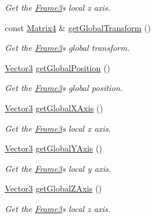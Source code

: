 \begin{DoxyCompactItemize}
\begin{DoxyCompactList}\small\item\em Get the \hyperlink{class_i_dream_sky_1_1_frame3}{Frame3}\textquotesingle{}s local z axis. \end{DoxyCompactList}\item 
const \hyperlink{class_i_dream_sky_1_1_matrix4}{Matrix4} \& \hyperlink{class_i_dream_sky_1_1_frame3_a57a2f755811f485d9602103609c78d68}{get\+Global\+Transform} ()
\begin{DoxyCompactList}\small\item\em Get the \hyperlink{class_i_dream_sky_1_1_frame3}{Frame3}\textquotesingle{}s global transform. \end{DoxyCompactList}\item 
\hyperlink{class_i_dream_sky_1_1_vector3}{Vector3} \hyperlink{class_i_dream_sky_1_1_frame3_a02ef2b5e486c10f94fdf13885c37ebc6}{get\+Global\+Position} ()
\begin{DoxyCompactList}\small\item\em Get the \hyperlink{class_i_dream_sky_1_1_frame3}{Frame3}\textquotesingle{}s global position. \end{DoxyCompactList}\item 
\hyperlink{class_i_dream_sky_1_1_vector3}{Vector3} \hyperlink{class_i_dream_sky_1_1_frame3_aa8919e85a3ebe1869aa8b1ba439bc92f}{get\+Global\+X\+Axis} ()
\begin{DoxyCompactList}\small\item\em Get the \hyperlink{class_i_dream_sky_1_1_frame3}{Frame3}\textquotesingle{}s local x axis. \end{DoxyCompactList}\item 
\hyperlink{class_i_dream_sky_1_1_vector3}{Vector3} \hyperlink{class_i_dream_sky_1_1_frame3_a0692e3724e53edf06e828470e74833cd}{get\+Global\+Y\+Axis} ()
\begin{DoxyCompactList}\small\item\em Get the \hyperlink{class_i_dream_sky_1_1_frame3}{Frame3}\textquotesingle{}s local y axis. \end{DoxyCompactList}\item 
\hyperlink{class_i_dream_sky_1_1_vector3}{Vector3} \hyperlink{class_i_dream_sky_1_1_frame3_a34cb4c58d842bc9dc2622bdb7690446f}{get\+Global\+Z\+Axis} ()
\begin{DoxyCompactList}\small\item\em Get the \hyperlink{class_i_dream_sky_1_1_frame3}{Frame3}\textquotesingle{}s local z axis. \end{DoxyCompactList}\item 

\end{DoxyCompactItemize}
